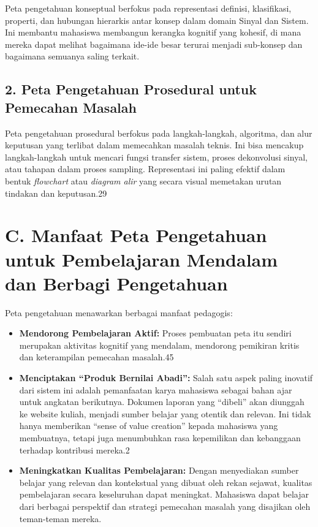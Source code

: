 \documentclass[
  letterpaper,
  DIV=11,
  numbers=noendperiod]{scrreprt}
\begin{document}
Peta pengetahuan konseptual berfokus pada representasi definisi,
klasifikasi, properti, dan hubungan hierarkis antar konsep dalam domain
Sinyal dan Sistem. Ini membantu mahasiswa membangun kerangka kognitif
yang kohesif, di mana mereka dapat melihat bagaimana ide-ide besar
terurai menjadi sub-konsep dan bagaimana semuanya saling terkait.

\subsection{2. Peta Pengetahuan Prosedural untuk Pemecahan
Masalah}\label{peta-pengetahuan-prosedural-untuk-pemecahan-masalah}

Peta pengetahuan prosedural berfokus pada langkah-langkah, algoritma,
dan alur keputusan yang terlibat dalam memecahkan masalah teknis. Ini
bisa mencakup langkah-langkah untuk mencari fungsi transfer sistem,
proses dekonvolusi sinyal, atau tahapan dalam proses sampling.
Representasi ini paling efektif dalam bentuk \emph{flowchart} atau
\emph{diagram alir} yang secara visual memetakan urutan tindakan dan
keputusan.29

\section{C. Manfaat Peta Pengetahuan untuk Pembelajaran Mendalam dan
Berbagi
Pengetahuan}\label{c.-manfaat-peta-pengetahuan-untuk-pembelajaran-mendalam-dan-berbagi-pengetahuan}

Peta pengetahuan menawarkan berbagai manfaat pedagogis:

\begin{itemize}
\item
  \textbf{Mendorong Pembelajaran Aktif:} Proses pembuatan peta itu
  sendiri merupakan aktivitas kognitif yang mendalam, mendorong
  pemikiran kritis dan keterampilan pemecahan masalah.45
\item
  \textbf{Menciptakan ``Produk Bernilai Abadi'':} Salah satu aspek
  paling inovatif dari sistem ini adalah pemanfaatan karya mahasiswa
  sebagai bahan ajar untuk angkatan berikutnya. Dokumen laporan yang
  ``dibeli'' akan diunggah ke website kuliah, menjadi sumber belajar
  yang otentik dan relevan. Ini tidak hanya memberikan ``sense of value
  creation'' kepada mahasiswa yang membuatnya, tetapi juga menumbuhkan
  rasa kepemilikan dan kebanggaan terhadap kontribusi mereka.2
\item
  \textbf{Meningkatkan Kualitas Pembelajaran:} Dengan menyediakan sumber
  belajar yang relevan dan kontekstual yang dibuat oleh rekan sejawat,
  kualitas pembelajaran secara keseluruhan dapat meningkat. Mahasiswa
  dapat belajar dari berbagai perspektif dan strategi pemecahan masalah
  yang disajikan oleh teman-teman mereka.
\end{itemize}
\end{document}
